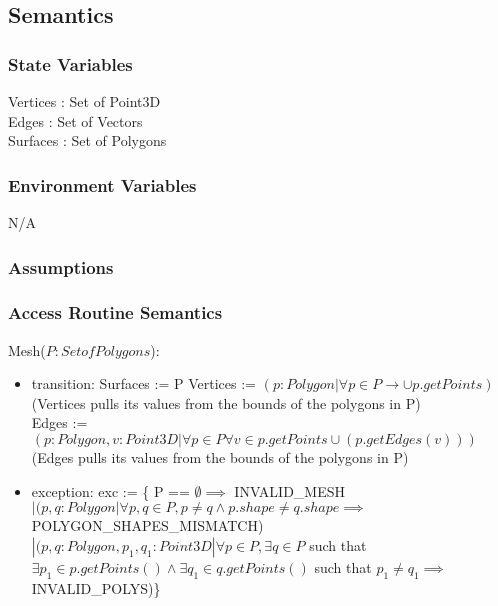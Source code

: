 \documentclass[12pt, titlepage]{article}
\begin{document}
\subsection{Semantics}
\subsubsection{State Variables}
Vertices : Set of Point3D\\
Edges : Set of Vectors\\
Surfaces : Set of Polygons \\

\subsubsection{Environment Variables}
N/A

\subsubsection{Assumptions}

\subsubsection{Access Routine Semantics}
\noindent Mesh($P:Set of Polygons$):
\begin{itemize}
	\item transition: Surfaces := P
	Vertices := $(p:Polygon | \forall p \in P \to \cup p.getPoints)$\\
	(Vertices pulls its values from the bounds of the polygons in P)\\
	Edges := $(p:Polygon, v:Point3D | \forall p \in P \forall v \in p.getPoints 
	\cup (p.getEdges(v)))$\\
	(Edges pulls its values from the bounds of the polygons in P)\\
	\item exception: exc := \{ P == $\emptyset \implies$ INVALID\_MESH\\ $| 
	(p,q:Polygon| \forall p, q \in P, p \neq q \land p.shape \neq q.shape 
	\implies$ POLYGON\_SHAPES\_MISMATCH)\\ $| (p,q:Polygon, 
	p_{1},q_{1}:Point3D| 
	\forall p \in P, \exists q \in P$ such that $\exists p_{1} \in 
	p.getPoints() 
	\land \exists q_{1} \in q.getPoints()$ such that $p_{1} \neq q_{1} 
	\implies$ 
	INVALID\_POLYS)\}
	
\end{itemize}
\end{document}

